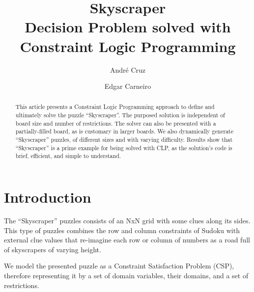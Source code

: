 \documentclass{llncs}
\begin{document}
\title{Skyscraper\\Decision Problem solved with Constraint Logic Programming}
%
%
\author{Andr\'e Cruz \and Edgar Carneiro}
%
%
%

\maketitle              %

\begin{abstract}
This article presents a Constraint Logic Programming approach to define and ultimately solve the puzzle ``Skyscraper''.
The purposed solution is independent of board size and number of restrictions.
The solver can also be presented with a partially-filled board, as is customary in larger boards.
We also dynamically generate ``Skyscraper'' puzzles, of different sizes and with varying difficulty.
Results show that ``Skyscraper'' is a prime example for being solved with CLP, as the solution's code is brief, efficient, and simple to understand.

\end{abstract}
%
\section{Introduction}
%
The ``Skyscraper'' puzzles consists of an NxN grid with some clues along its sides. This type of puzzles combines the row and column constraints of Sudoku with external clue values that re-imagine each row or column of numbers as a road full of skyscrapers of varying height.

We model the presented puzzle as a Constraint Satisfaction Problem (CSP), therefore representing it by a set of domain variables, their domains, and a set of restrictions.
\end{document}

